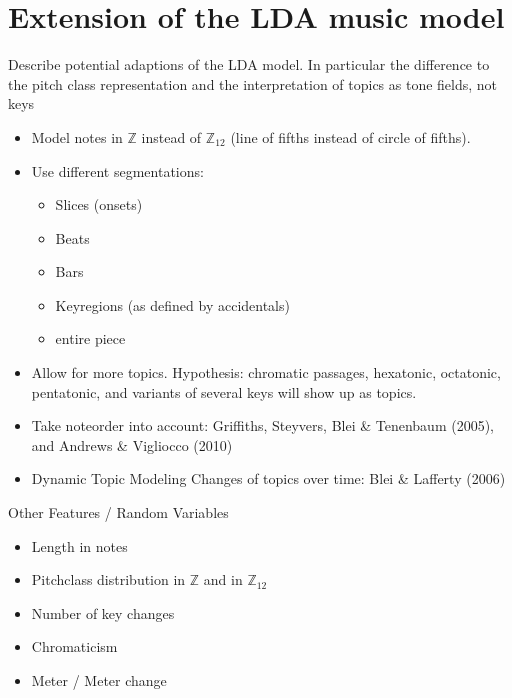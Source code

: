 \documentclass[letterpaper,10pt,english]{sphinxmanual}
\begin{document}
\section{Extension of the LDA music model}
\label{\detokenize{topic_modeling:extension-of-the-lda-music-model}}
\sphinxAtStartPar
Describe potential adaptions of the LDA model. In particular the
difference to the pitch class representation and the interpretation of
topics as tone fields, not keys
\begin{itemize}
\item {} 
\sphinxAtStartPar
Model notes in \(\mathbb Z\) instead of \(\mathbb Z_{12}\)
(line of fifths instead of circle of fifths).

\item {} 
\sphinxAtStartPar
Use different segmentations:
\begin{itemize}
\item {} 
\sphinxAtStartPar
Slices (onsets)

\item {} 
\sphinxAtStartPar
Beats

\item {} 
\sphinxAtStartPar
Bars

\item {} 
\sphinxAtStartPar
Key\sphinxhyphen{}regions (as defined by accidentals)

\item {} 
\sphinxAtStartPar
entire piece

\end{itemize}

\item {} 
\sphinxAtStartPar
Allow for more topics. Hypothesis: chromatic passages, hexatonic,
octatonic, pentatonic, and variants of several keys will show up as
topics.

\item {} 
\sphinxAtStartPar
Take note\sphinxhyphen{}order into account: Griffiths, Steyvers, Blei \& Tenenbaum
(2005), and Andrews \& Vigliocco (2010)

\item {} 
\sphinxAtStartPar
Dynamic Topic Modeling \sphinxhyphen{} Changes of topics over time: Blei \& Lafferty
(2006)

\end{itemize}

\sphinxAtStartPar
Other Features / Random Variables
\begin{itemize}
\item {} 
\sphinxAtStartPar
Length in notes

\item {} 
\sphinxAtStartPar
Pitch\sphinxhyphen{}class distribution in \(\mathbb Z\) and in
\(\mathbb Z_{12}\)

\item {} 
\sphinxAtStartPar
Number of key changes

\item {} 
\sphinxAtStartPar
Chromaticism

\item {} 
\sphinxAtStartPar
Meter / Meter change

\end{itemize}
\end{document}
